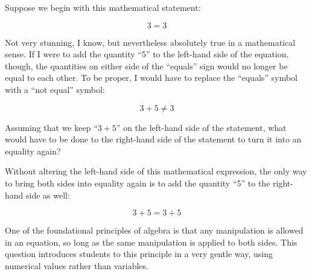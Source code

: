 

Suppose we begin with this mathematical statement:

$$3 = 3$$

Not very stunning, I know, but nevertheless absolutely true in a mathematical sense.  If I were to add the quantity ``5'' to the left-hand side of the equation, though, the quantities on either side of the ``equals'' sign would no longer be equal to each other.  To be proper, I would have to replace the ``equals'' symbol with a ``not equal'' symbol:

$$3 + 5 \not = 3$$ 

Assuming that we keep ``$3 + 5$'' on the left-hand side of the statement, what would have to be done to the right-hand side of the statement to turn it into an equality again?







Without altering the left-hand side of this mathematical expression, the only way to bring both sides into equality again is to add the quantity ``5'' to the right-hand side as well:

$$3 + 5 = 3 + 5$$ 







One of the foundational principles of algebra is that any manipulation is allowed in an equation, so long as the same manipulation is applied to both sides.  This question introduces students to this principle in a very gentle way, using numerical values rather than variables.




